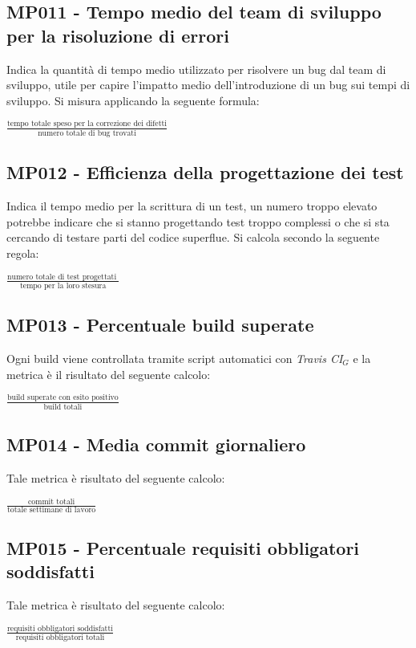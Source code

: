 \subsection{MP011 - Tempo medio del team di sviluppo per la risoluzione di errori}
Indica la quantità di tempo medio utilizzato per risolvere un bug dal team di sviluppo, utile per capire l'impatto medio dell'introduzione di un bug sui tempi di sviluppo. Si misura applicando la seguente formula:
\begin{center}
	\vspace{1em}
	$\frac{\mbox{tempo totale speso per la correzione dei difetti}}{\mbox{numero totale di bug trovati}}$
\end{center}


\subsection{MP012 - Efficienza della progettazione dei test}
Indica il tempo medio per la scrittura di un test, un numero troppo elevato potrebbe indicare che si stanno progettando test troppo complessi  o che si sta cercando di testare  parti del codice superflue. Si calcola secondo la seguente regola:
\begin{center}
	\vspace{1em}
	$\frac{\mbox{numero totale di test progettati }}{\mbox{tempo per la loro stesura}}$\\
\end{center}


\subsection{MP013 - Percentuale build superate}
Ogni build viene controllata tramite script automatici con \textit{Travis CI$_{G}$} e la metrica è il risultato del seguente calcolo:
\begin{center}
$\frac{\mbox{build superate con esito positivo}}{\mbox{build totali}}$
\end{center}


\subsection{MP014 - Media commit giornaliero}
Tale metrica è risultato del seguente calcolo:
\begin{center}
	$\frac{\mbox{commit totali}}{\mbox{totale settimane di lavoro}}$
\end{center}


\subsection{MP015 - Percentuale requisiti obbligatori soddisfatti}
 Tale metrica è risultato del seguente calcolo:
 \begin{center}
 	$\frac{\mbox{requisiti obbligatori soddisfatti}}{\mbox{requisiti obbligatori totali}}$
 \end{center}

